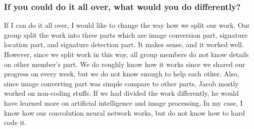 \documentclass[article, onecolumn, draftclsnofoot,10pt, compsoc]{IEEEtran}
\begin{document}
\subsubsection{If you could do it all over, what would you do differently?}
If I can do it all over, I would like to change the way how we split our work. Our group split the work into three parts which are image conversion part, signature location part, and signature detection part. It makes sense, and it worked well. However, since we split work in this way, all group members do not know details on other member’s part. We do roughly know how it works since we shared our progress on every week, but we do not know enough to help each other. Also, since image converting part was simple compare to other parts, Jacob mostly worked on non-coding stuffs. If we had divided the work differently, he would have learned more on artificial intelligence and image processing. In my case, I know how our convolution neural network works, but do not know how to hard code it.
\end{document}

